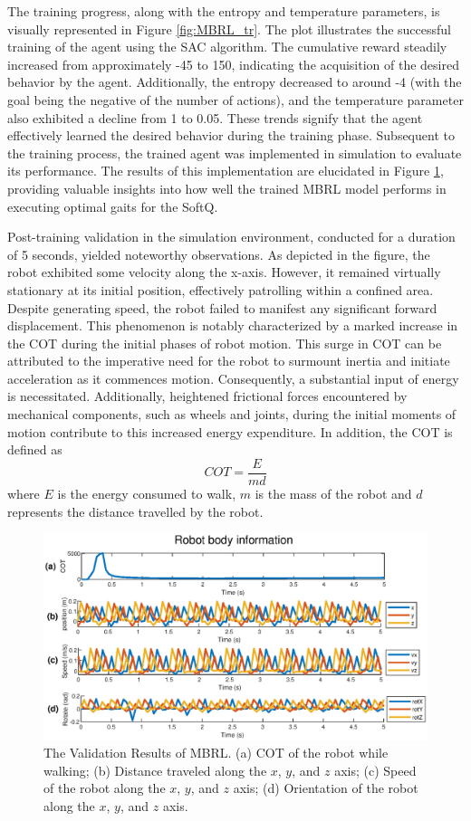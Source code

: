 The training progress, along with the entropy and temperature parameters, is visually represented in Figure \ref{fig:MBRL_tr}. The plot illustrates the successful training of the agent using the SAC algorithm. The cumulative reward steadily increased from approximately -45 to 150, indicating the acquisition of the desired behavior by the agent. Additionally, the entropy decreased to around -4 (with the goal being the negative of the number of actions), and the temperature parameter also exhibited a decline from 1 to 0.05. These trends signify that the agent effectively learned the desired behavior during the training phase. Subsequent to the training process, the trained agent was implemented in simulation to evaluate its performance. The results of this implementation are elucidated in Figure \ref{fig:MBRL_val}, providing valuable insights into how well the trained MBRL model performs in executing optimal gaits for the SoftQ. 

Post-training validation in the simulation environment, conducted for a duration of 5 seconds, yielded noteworthy observations. As depicted in the figure, the robot exhibited some velocity along the x-axis. However, it remained virtually stationary at its initial position, effectively patrolling within a confined area. Despite generating speed, the robot failed to manifest any significant forward displacement. This phenomenon is notably characterized by a marked increase in the \ac{COT} during the initial phases of robot motion. This surge in \ac{COT} can be attributed to the imperative need for the robot to surmount inertia and initiate acceleration as it commences motion. Consequently, a substantial input of energy is necessitated. Additionally, heightened frictional forces encountered by mechanical components, such as wheels and joints, during the initial moments of motion contribute to this increased energy expenditure. In addition, the COT is defined as $$COT = \frac{E}{md}$$ where $E$ is the energy consumed to walk, $m$ is the mass of the robot and $d$ represents the distance travelled by the robot.

\begin{figure}[htb]
    \centering
    \includegraphics[width=\linewidth]{img/chap5/MBRL_val.eps}
    \caption{The Validation Results of MBRL. (a) COT of the robot while walking; (b) Distance traveled along the $x$, $y$, and $z$ axis; (c) Speed of the robot along the $x$, $y$, and $z$ axis; (d) Orientation of the robot along the $x$, $y$, and $z$ axis.}
    \label{fig:MBRL_val}
\end{figure}

